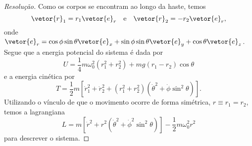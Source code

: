 \begin{proof}[Resolução]
    Como os corpos se encontram ao longo da haste, temos
    \begin{equation*}
        \vetor{r}_1 = r_1\vetor{e}_r\quad\text{e}\quad \vetor{r}_2 = - r_2 \vetor{e}_r,
    \end{equation*}
    onde \(\vetor{e}_r = \cos\phi\sin\theta \vetor{e}_x + \sin\phi\sin\theta \vetor{e}_y + \cos\theta \vetor{e}_z\). Segue que a energia potencial do sistema é dada por
    \begin{equation*}
        U = \frac14 m \omega_0^2\left(r_1^2 + r_2^2\right) + mg\left(r_1 - r_2\right)\cos\theta
    \end{equation*}
    e a energia cinética por
    \begin{equation*}
        T = \frac12 m\left[\dot{r}_1^2 + \dot{r}_2^2 + \left(r_1^2 + r_2^2\right)\left(\dot{\theta}^2 + \dot{\phi}\sin^2\theta\right)\right].
    \end{equation*}
    Utilizando o vínculo de que o movimento ocorre de forma simétrica, \(r \equiv r_1 = r_2\), temos a lagrangiana
    \begin{equation*}
        L = m\left[\dot{r}^2 + r^2\left(\dot{\theta}^2 + \dot{\phi}^2\sin^2\theta\right)\right] - \frac12 m \omega_0^2r^2
    \end{equation*}
    para descrever o sistema.


\end{proof}
